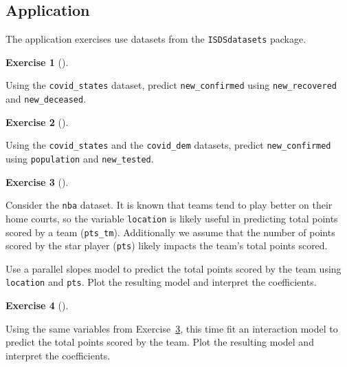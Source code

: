 \documentclass[
  letterpaper,
  DIV=11,
  numbers=noendperiod]{scrreprt}
\theoremstyle{definition}
\newtheorem{exercise}{Exercise}[chapter]
\theoremstyle{remark}
\begin{document}
\hypertarget{sec-ex06-application}{%
\subsection{Application}\label{sec-ex06-application}}

The application exercises use datasets from the \texttt{ISDSdatasets}
package.

\leavevmode{}%
\begin{exercise}[]\label{exr-ch06-app1}

Using the \texttt{covid\_states} dataset, predict
\texttt{new\_confirmed} using \texttt{new\_recovered} and
\texttt{new\_deceased}.

\end{exercise}

\leavevmode{}%
\begin{exercise}[]\label{exr-ch06-app2}

Using the \texttt{covid\_states} and the \texttt{covid\_dem} datasets,
predict \texttt{new\_confirmed} using \texttt{population} and
\texttt{new\_tested}.

\end{exercise}

\leavevmode{}%
\begin{exercise}[]\label{exr-ch06-app3}

Consider the \texttt{nba} dataset. It is known that teams tend to play
better on their home courts, so the variable \texttt{location} is likely
useful in predicting total points scored by a team (\texttt{pts\_tm}).
Additionally we assume that the number of points scored by the star
player (\texttt{pts}) likely impacts the team's total points scored.

Use a parallel slopes model to predict the total points scored by the
team using \texttt{location} and \texttt{pts}. Plot the resulting model
and interpret the coefficients.

\end{exercise}

\leavevmode{}%
\begin{exercise}[]\label{exr-ch06-app4}

Using the same variables from Exercise~\ref{exr-ch06-app3}, this time
fit an interaction model to predict the total points scored by the team.
Plot the resulting model and interpret the coefficients.

\end{exercise}
\end{document}
